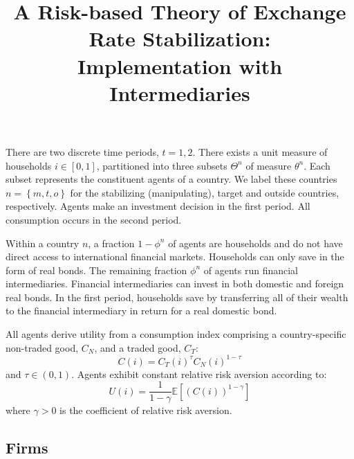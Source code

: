 \documentclass[12pt]{article}
\begin{document}
\author{}
\title{A Risk-based Theory of Exchange Rate Stabilization: \\
  Implementation with Intermediaries}

\maketitle


\noindent
There are two discrete time periods, $t = 1, 2$. There exists a unit
measure of households $i \in [0, 1]$, partitioned into three subsets
$\Theta^n$ of measure $\theta^n$. Each subset represents the
constituent agents of a country. We label these countries
$n = \left\{ m, t, o \right\}$ for the stabilizing (manipulating),
target and outside countries, respectively. Agents make an investment
decision in the first period. All consumption occurs in the second
period.

Within a country $n$, a fraction $1 - \phi^n$ of agents are households
and do not have direct access to international financial markets.
Households can only save in the form of real bonds. The remaining
fraction $\phi^n$ of agents run financial intermediaries. Financial
intermediaries can invest in both domestic and foreign real bonds. In
the first period, households save by transferring all of their wealth
to the financial intermediary in return for a real domestic bond.

All agents derive utility from a consumption index comprising a
country-specific non-traded good, $C_N$, and a traded good, $C_T$:
\begin{equation*}
  C(i) = C_T(i)^{\tau} C_N(i)^{1 - \tau}
\end{equation*}
and $\tau \in (0, 1)$. Agents exhibit constant relative risk aversion
according to:
\begin{equation}
  U(i) = \frac{1}{1 - \gamma} 
  \mathbb{E}\left[  \left( C(i) \right)^{1 - \gamma} \right]
  \label{eqn:utility}
\end{equation}
where $\gamma > 0$ is the coefficient of relative risk aversion.

\subsection*{Firms}
\end{document}
